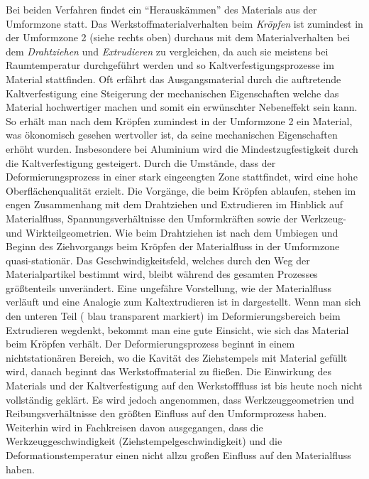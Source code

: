 \documentclass[12pt,a4paper,parskip,twoside,BCOR5mm,headsepline]{scrartcl}
\begin{document}
\begin{description*}
Bei beiden Verfahren findet ein "`Herauskämmen"' des Materials aus der Umformzone statt. Das Werkstoffmaterialverhalten beim \emph{Kröpfen} ist zumindest in der Umformzone 2 (siehe  rechts oben) durchaus mit dem Materialverhalten bei dem \emph{Drahtziehen} und \emph{Extrudieren} zu vergleichen, da auch sie meistens bei Raumtemperatur durchgeführt werden und so Kaltverfestigungsprozesse im Material stattfinden. Oft erfährt das Ausgangsmaterial durch die auftretende Kaltverfestigung        
eine Steigerung der mechanischen Eigenschaften welche das Material hochwertiger machen und somit ein erwünschter Nebeneffekt sein kann. So erhält man nach dem Kröpfen zumindest in der Umformzone 2 ein Material, was ökonomisch gesehen wertvoller ist, da seine mechanischen Eigenschaften erhöht wurden. Insbesondere bei Aluminium wird die Mindestzugfestigkeit durch die Kaltverfestigung gesteigert. Durch die Umstände, dass der Deformierungsprozess in einer stark eingeengten Zone stattfindet, wird eine hohe Oberflächenqualität erzielt. Die Vorgänge, die beim Kröpfen ablaufen,  stehen im engen Zusammenhang mit dem Drahtziehen und Extrudieren im Hinblick auf  Materialfluss, Spannungsverhältnisse den Umformkräften sowie der Werkzeug- und Wirkteilgeometrien. Wie beim Drahtziehen ist nach dem Umbiegen und Beginn des Ziehvorgangs beim Kröpfen der Materialfluss in der Umformzone quasi-stationär. Das Geschwindigkeitsfeld, welches durch den Weg der Materialpartikel bestimmt wird, bleibt während des gesamten Prozesses größtenteils unverändert. Eine ungefähre Vorstellung, wie der Materialfluss verläuft und  eine Analogie zum Kaltextrudieren ist in  dargestellt. Wenn man sich den unteren Teil ( blau transparent markiert) im Deformierungsbereich beim Extrudieren wegdenkt, bekommt man  eine gute Einsicht, wie sich das Material beim Kröpfen verhält. Der Deformierungsprozess beginnt in einem nichtstationären Bereich,  wo die Kavität des Ziehstempels mit Material gefüllt wird, danach beginnt das  Werkstoffmaterial zu fließen. Die Einwirkung des Materials und der Kaltverfestigung auf den Werkstofffluss ist bis heute noch nicht vollständig geklärt. Es wird jedoch angenommen, dass  
Werkzeuggeometrien und Reibungsverhältnisse den größten Einfluss auf den Umformprozess haben. Weiterhin wird in Fachkreisen davon ausgegangen, dass die Werkzeuggeschwindigkeit (Ziehstempelgeschwindigkeit) und die Deformationstemperatur einen nicht allzu großen Einfluss auf den Materialfluss haben. \autocite[13.10]{kl} 



\end{description*}
\end{document}
